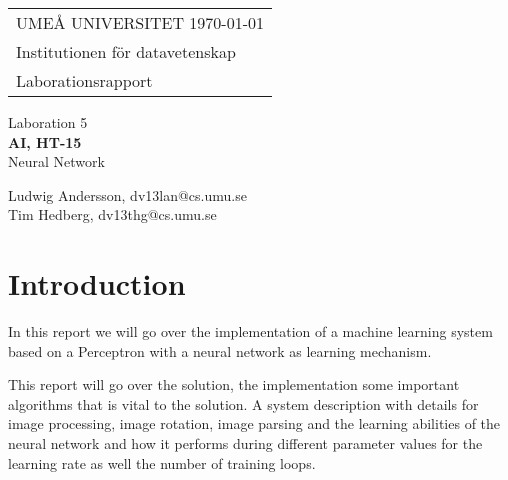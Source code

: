 \documentclass[a4paper, 12pt]{article}
\makeatletter
\def\title{Neural Network}
\def\preTitle{Laboration 5}
\def\kurs{AI, HT-15}
\def\namn{Ludwig Andersson}
\def\mail{dv13lan@cs.umu.se}
\def\namnn{Tim Hedberg}
\def\maill{dv13thg@cs.umu.se}
\def\inst{datavetenskap}
\def\dokumentTyp{Laborationsrapport}
\makeatother
\begin{document}
\begin{titlepage}
  \thispagestyle{empty}
  \begin{small}
    \begin{tabular}{@{}p{\textwidth}@{}}
      UMEÅ UNIVERSITET \hfill \today \\
      Institutionen för \inst \\
      \dokumentTyp \\
    \end{tabular}
  \end{small}
  \vspace{10mm}
  \begin{center}
    \LARGE{\preTitle} \\
    \huge{\textbf{\kurs}} \\
    \vspace{10mm}
    \LARGE{\title} \\
    \vspace{15mm}
    \begin{large}
        \namn, \mail \\
        \namnn, \maill \\
    \end{large}
    \vfill
  \end{center}
\end{titlepage}

\newpage
\mbox{}
\vspace{70mm}
\begin{center}
\end{center}
\thispagestyle{empty}
\newpage

\pagestyle{fancy}
\rhead{\today}
\lhead{\title}
\chead{}
\lfoot{}
\cfoot{}
\rfoot{}

\cleardoublepage
\newpage
\dosecttoc 
\tableofcontents
\cleardoublepage

\rfoot{\thepage}

\section*{Introduction}
In this report we will go over the implementation of a machine learning system based on a Perceptron with a neural network as learning mechanism.

This report will go over the solution, the implementation some important algorithms that is vital to the solution. A system description with details for image processing, image rotation, image parsing and the learning abilities of the neural network and how it performs during different parameter values for the learning rate as well the number of training loops. 
\end{document}
